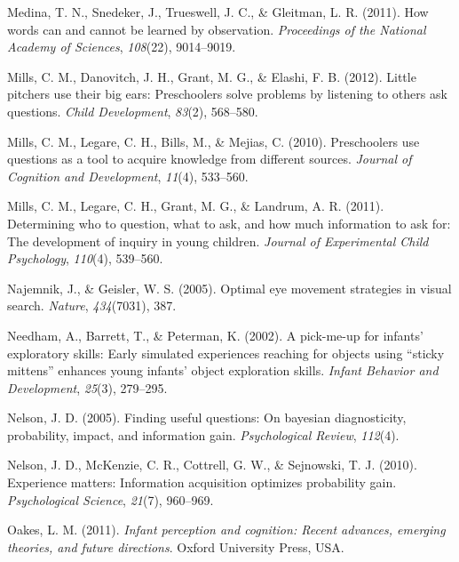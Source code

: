 \documentclass[oneside]{report}
\begin{document}
\leavevmode\hypertarget{ref-medina2011words}{}%
Medina, T. N., Snedeker, J., Trueswell, J. C., \& Gleitman, L. R.
(2011). How words can and cannot be learned by observation.
\emph{Proceedings of the National Academy of Sciences}, \emph{108}(22),
9014--9019.

\leavevmode\hypertarget{ref-mills2012little}{}%
Mills, C. M., Danovitch, J. H., Grant, M. G., \& Elashi, F. B. (2012).
Little pitchers use their big ears: Preschoolers solve problems by
listening to others ask questions. \emph{Child Development},
\emph{83}(2), 568--580.

\leavevmode\hypertarget{ref-mills2010preschoolers}{}%
Mills, C. M., Legare, C. H., Bills, M., \& Mejias, C. (2010).
Preschoolers use questions as a tool to acquire knowledge from different
sources. \emph{Journal of Cognition and Development}, \emph{11}(4),
533--560.

\leavevmode\hypertarget{ref-mills2011determining}{}%
Mills, C. M., Legare, C. H., Grant, M. G., \& Landrum, A. R. (2011).
Determining who to question, what to ask, and how much information to
ask for: The development of inquiry in young children. \emph{Journal of
Experimental Child Psychology}, \emph{110}(4), 539--560.

\leavevmode\hypertarget{ref-najemnik2005optimal}{}%
Najemnik, J., \& Geisler, W. S. (2005). Optimal eye movement strategies
in visual search. \emph{Nature}, \emph{434}(7031), 387.

\leavevmode\hypertarget{ref-needham2002pick}{}%
Needham, A., Barrett, T., \& Peterman, K. (2002). A pick-me-up for
infants' exploratory skills: Early simulated experiences reaching for
objects using ``sticky mittens'' enhances young infants' object
exploration skills. \emph{Infant Behavior and Development},
\emph{25}(3), 279--295.

\leavevmode\hypertarget{ref-nelson2005finding}{}%
Nelson, J. D. (2005). Finding useful questions: On bayesian
diagnosticity, probability, impact, and information gain.
\emph{Psychological Review}, \emph{112}(4).

\leavevmode\hypertarget{ref-nelson2010experience}{}%
Nelson, J. D., McKenzie, C. R., Cottrell, G. W., \& Sejnowski, T. J.
(2010). Experience matters: Information acquisition optimizes
probability gain. \emph{Psychological Science}, \emph{21}(7), 960--969.

\leavevmode\hypertarget{ref-oakes2011infant}{}%
Oakes, L. M. (2011). \emph{Infant perception and cognition: Recent
advances, emerging theories, and future directions}. Oxford University
Press, USA.
\end{document}
